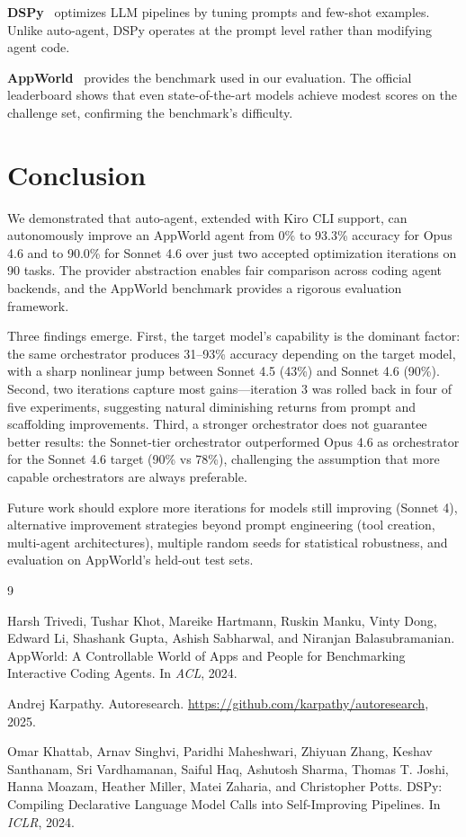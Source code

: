 \documentclass[11pt,a4paper]{article}
\begin{document}
\textbf{DSPy}~\cite{dspy} optimizes LLM pipelines by tuning prompts and few-shot examples. Unlike auto-agent, DSPy operates at the prompt level rather than modifying agent code.

\textbf{AppWorld}~\cite{appworld} provides the benchmark used in our evaluation. The official leaderboard shows that even state-of-the-art models achieve modest scores on the challenge set, confirming the benchmark's difficulty.

\section{Conclusion}

We demonstrated that auto-agent, extended with Kiro CLI support, can autonomously improve an AppWorld agent from 0\% to 93.3\% accuracy for Opus 4.6 and to 90.0\% for Sonnet 4.6 over just two accepted optimization iterations on 90 tasks. The provider abstraction enables fair comparison across coding agent backends, and the AppWorld benchmark provides a rigorous evaluation framework.

Three findings emerge. First, the target model's capability is the dominant factor: the same orchestrator produces 31--93\% accuracy depending on the target model, with a sharp nonlinear jump between Sonnet 4.5 (43\%) and Sonnet 4.6 (90\%). Second, two iterations capture most gains---iteration 3 was rolled back in four of five experiments, suggesting natural diminishing returns from prompt and scaffolding improvements. Third, a stronger orchestrator does not guarantee better results: the Sonnet-tier orchestrator outperformed Opus 4.6 as orchestrator for the Sonnet 4.6 target (90\% vs 78\%), challenging the assumption that more capable orchestrators are always preferable.

Future work should explore more iterations for models still improving (Sonnet 4), alternative improvement strategies beyond prompt engineering (tool creation, multi-agent architectures), multiple random seeds for statistical robustness, and evaluation on AppWorld's held-out test sets.

\begin{thebibliography}{9}

Harsh Trivedi, Tushar Khot, Mareike Hartmann, Ruskin Manku, Vinty Dong, Edward Li, Shashank Gupta, Ashish Sabharwal, and Niranjan Balasubramanian.
\newblock AppWorld: A Controllable World of Apps and People for Benchmarking Interactive Coding Agents.
\newblock In \emph{ACL}, 2024.

Andrej Karpathy.
\newblock Autoresearch.
\newblock \url{https://github.com/karpathy/autoresearch}, 2025.

Omar Khattab, Arnav Singhvi, Paridhi Maheshwari, Zhiyuan Zhang, Keshav Santhanam, Sri Vardhamanan, Saiful Haq, Ashutosh Sharma, Thomas T. Joshi, Hanna Moazam, Heather Miller, Matei Zaharia, and Christopher Potts.
\newblock DSPy: Compiling Declarative Language Model Calls into Self-Improving Pipelines.
\newblock In \emph{ICLR}, 2024.

\end{thebibliography}
\end{document}
